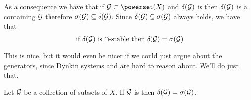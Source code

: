\begin{remark}
	As a consequence we have that if $\calG \subset \powerset(X)$ and $\delta(\mathcal{G})$ is \istable then $\delta(\mathcal{G})$ is a \siga containing $\mathcal{G}$ therefore $\sigma(\mathcal{G}) \subseteq \delta(\mathcal{G})$. Since $\delta(\mathcal{G}) \subseteq \sigma(\mathcal{G})$ always holds, we have that
	\begin{align*}
	\text{ if } \delta(\mathcal{G}) \text{ is $\cap$-stable then } \delta(\mathcal{G}) = \sigma(\mathcal{G})
	\end{align*}
\end{remark}

This is nice, but it would even be nicer if we could just argue about the generators, since Dynkin systems and \sigas are hard to reason about. We'll do just that.

\begin{thm}
	Let $\mathcal{G}$ be a collection of subsets of $X$. If $\mathcal{G}$ is \istable then $\delta(\mathcal{G}) = \sigma(\mathcal{G})$.
\end{thm}

